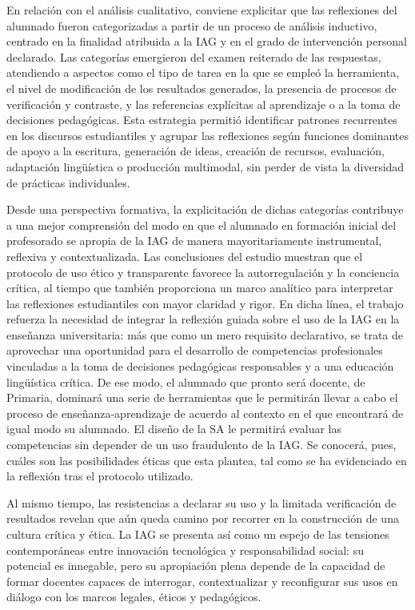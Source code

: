\documentclass[spanish]{textolivre}
\begin{document}
En relación con el análisis cualitativo, conviene explicitar que las reflexiones del alumnado fueron categorizadas a partir de un proceso de análisis inductivo, centrado en la finalidad atribuida a la IAG y en el grado de intervención personal declarado. Las categorías emergieron del examen reiterado de las respuestas, atendiendo a aspectos como el tipo de tarea en la que se empleó la herramienta, el nivel de modificación de los resultados generados, la presencia de procesos de verificación y contraste, y las referencias explícitas al aprendizaje o a la toma de decisiones pedagógicas. Esta estrategia permitió identificar patrones recurrentes en los discursos estudiantiles y agrupar las reflexiones según funciones dominantes de apoyo a la escritura, generación de ideas, creación de recursos, evaluación, adaptación lingüística o producción multimodal, sin perder de vista la diversidad de prácticas individuales.

Desde una perspectiva formativa, la explicitación de dichas categorías contribuye a una mejor comprensión del modo en que el alumnado en formación inicial del profesorado se apropia de la IAG de manera mayoritariamente instrumental, reflexiva y contextualizada. Las conclusiones del estudio muestran que el protocolo de uso ético y transparente favorece la autorregulación y la conciencia crítica, al tiempo que también proporciona un marco analítico para interpretar las reflexiones estudiantiles con mayor claridad y rigor. En dicha línea, el trabajo refuerza la necesidad de integrar la reflexión guiada sobre el uso de la IAG en la enseñanza universitaria: más que como un mero requisito declarativo, se trata de aprovechar una oportunidad para el desarrollo de competencias profesionales vinculadas a la toma de decisiones pedagógicas responsables y a una educación lingüística crítica. De ese modo, el alumnado que pronto será docente, de Primaria, dominará una serie de herramientas que le permitirán llevar a cabo el proceso de enseñanza-aprendizaje de acuerdo al contexto en el que encontrará de igual modo su alumnado. El diseño de la SA le permitirá evaluar las competencias sin depender de un uso fraudulento de la IAG. Se conocerá, pues, cuáles son las posibilidades éticas que esta plantea, tal como se ha evidenciado en la reflexión tras el protocolo utilizado.

Al mismo tiempo, las resistencias a declarar su uso y la limitada verificación de resultados revelan que aún queda camino por recorrer en la construcción de una cultura crítica y ética. La IAG se presenta así como un espejo de las tensiones contemporáneas entre innovación tecnológica y responsabilidad social: su potencial es innegable, pero su apropiación plena depende de la capacidad de formar docentes capaces de interrogar, contextualizar y reconfigurar sus usos en diálogo con los marcos legales, éticos y pedagógicos.
\end{document}
